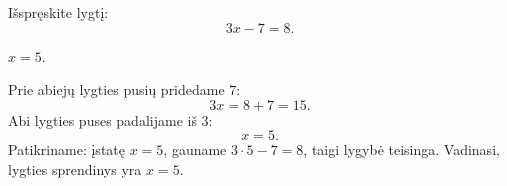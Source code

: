 \begin{salyga}
Išspręskite lygtį:
\[
  3x-7=8.
\]
\end{salyga}

\begin{atsakymas}
$x=5$.
\end{atsakymas}

\begin{sprendimas}
Prie abiejų lygties pusių pridedame $7$:
\[
  3x=8+7=15.
\]
Abi lygties puses padalijame iš $3$:
\[
  x=5.
\]
Patikriname: įstatę $x=5$, gauname $3\cdot5-7=8$, taigi lygybė teisinga.
Vadinasi, lygties sprendinys yra $x=5$.
\end{sprendimas}
